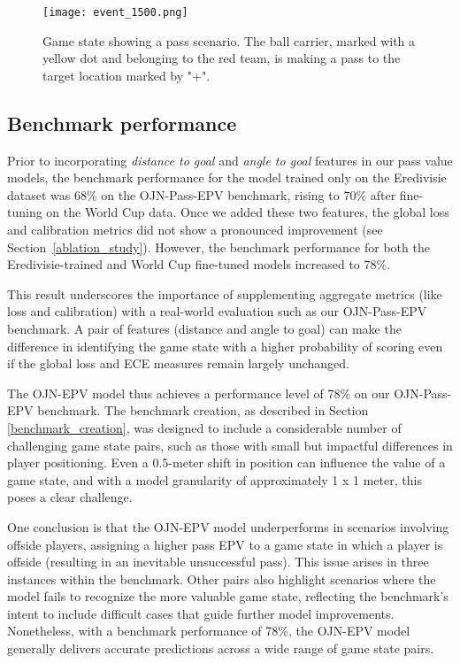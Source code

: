 \begin{figure}[h!]
\centering
\texttt{[image: event\_1500.png]}
\caption{Game state showing a pass scenario. The ball carrier, marked with a yellow dot and belonging to the red team, is making a pass to the target location marked by "+".}
\label{fig:event1500}
\end{figure}

\newpage

\subsection{Benchmark performance}\label{benchmark_performance}

Prior to incorporating \emph{distance to goal} and \emph{angle to goal} features in our pass value models, the benchmark performance for the model trained only on the Eredivisie dataset was 68\% on the OJN-Pass-EPV benchmark, rising to 70\% after fine-tuning on the World Cup data. Once we added these two features, the global loss and calibration metrics did not show a pronounced improvement (see Section~\ref{ablation_study}). However, the benchmark performance for both the Eredivisie-trained and World Cup fine-tuned models increased to 78\%.

This result underscores the importance of supplementing aggregate metrics (like loss and calibration) with a real-world evaluation such as our OJN-Pass-EPV benchmark. A pair of features (distance and angle to goal) can make the difference in identifying the game state with a higher probability of scoring even if the global loss and ECE measures remain largely unchanged.

The OJN-EPV model thus achieves a performance level of 78\% on our OJN-Pass-EPV benchmark. The benchmark creation, as described in Section \ref{benchmark_creation}, was designed to include a considerable number of challenging game state pairs, such as those with small but impactful differences in player positioning. Even a 0.5-meter shift in position can influence the value of a game state, and with a model granularity of approximately 1 x 1 meter, this poses a clear challenge.

One conclusion is that the OJN-EPV model underperforms in scenarios involving offside players, assigning a higher pass EPV to a game state in which a player is offside (resulting in an inevitable unsuccessful pass). This issue arises in three instances within the benchmark. Other pairs also highlight scenarios where the model fails to recognize the more valuable game state, reflecting the benchmark’s intent to include difficult cases that guide further model improvements. Nonetheless, with a benchmark performance of 78\%, the OJN-EPV model generally delivers accurate predictions across a wide range of game state pairs.

